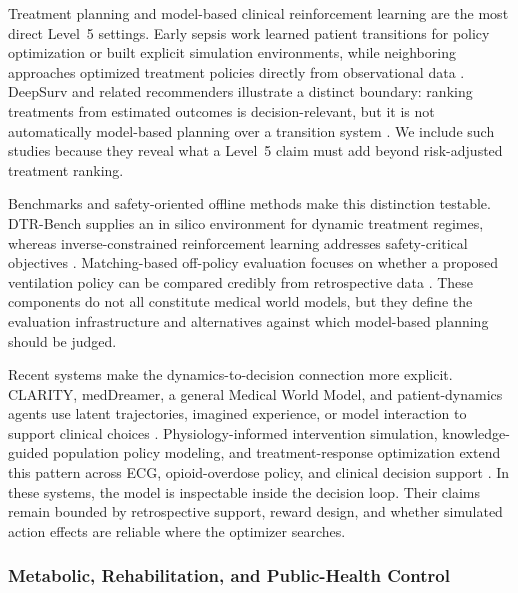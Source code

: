 Treatment planning and model-based clinical reinforcement learning are the most direct Level~5 settings. Early sepsis work learned patient transitions for policy optimization or built explicit simulation environments, while neighboring approaches optimized treatment policies directly from observational data \citep{Raghu2018ModelBasedReinforcement,Parbhoo2018Improvingcounterfactualreasoning,Komorowski2018AIClinician,Kiani2019SepsisWorldModel}. DeepSurv and related recommenders illustrate a distinct boundary: ranking treatments from estimated outcomes is decision-relevant, but it is not automatically model-based planning over a transition system \citep{Katzman2018DeepsurvPersonalizedTreatment}. We include such studies because they reveal what a Level~5 claim must add beyond risk-adjusted treatment ranking.

Benchmarks and safety-oriented offline methods make this distinction testable. DTR-Bench supplies an in silico environment for dynamic treatment regimes, whereas inverse-constrained reinforcement learning addresses safety-critical objectives \citep{Luo2024DtrBenchSilico,Fang2024OfflineInverseConstrained}. Matching-based off-policy evaluation focuses on whether a proposed ventilation policy can be compared credibly from retrospective data \citep{Lee2025MatchingBasedOff}. These components do not all constitute medical world models, but they define the evaluation infrastructure and alternatives against which model-based planning should be judged.

Recent systems make the dynamics-to-decision connection more explicit. CLARITY, medDreamer, a general Medical World Model, and patient-dynamics agents use latent trajectories, imagined experience, or model interaction to support clinical choices \citep{Ding2025CLARITYMedicalWorld,Yang2025MedicalWorldModel2,Xu2025medDreamer,Wu2026AgentifyingPatientDynamics}. Physiology-informed intervention simulation, knowledge-guided population policy modeling, and treatment-response optimization extend this pattern across ECG, opioid-overdose policy, and clinical decision support \citep{Chen2026ECGWMPhysiology,Ma2026Policy4oodKnowledgeGuided,Qin2026TreatmentResponseOptimized}. In these systems, the model is inspectable inside the decision loop. Their claims remain bounded by retrospective support, reward design, and whether simulated action effects are reliable where the optimizer searches.

\subsubsection{Metabolic, Rehabilitation, and Public-Health Control}

